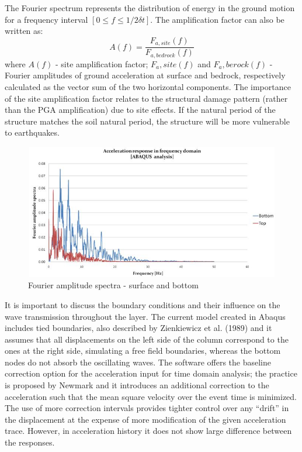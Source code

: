 	The Fourier spectrum represents the distribution of energy in the ground motion for a frequency interval $[0 ≤ f ≤ 1/2\delta t]$. The amplification factor can also be written as:
	\begin{equation}
	A(f)=\frac{F_{a,site}(f)}{F_{a,bedrock}(f)}
	\end{equation}
	where $A(f)$ - site amplification factor; $F_a,site(f)$ and $F_a,berock(f)$ - Fourier amplitudes of ground acceleration at surface and bedrock, respectively calculated as the vector sum of the two horizontal components. The importance of the site amplification factor relates to the structural damage pattern (rather than the PGA amplification) due to site effects. If the natural period of the structure matches the soil natural period, the structure will be more vulnerable to earthquakes. 
	\begin{figure}[h!]
		\centering
		\includegraphics[width=0.7\linewidth]{"Fourier"}
		\caption{Fourier amplitude spectra - surface and bottom}
		\label{fourier}
	\end{figure}
	It is important to discuss the boundary conditions and their influence on the wave transmission throughout the layer. The current model created in Abaqus includes tied boundaries, also described by Zienkiewicz et al. (1989) \cite{zienkiewicz1989earthquake} and it assumes that all displacements on the left side of the column correspond to the ones at the right side, simulating a free field boundaries, whereas the bottom nodes do not absorb the oscillating waves. The software offers the baseline correction option for the acceleration input for time domain analysis; the practice is proposed by Newmark \cite{newmark1959method} and it introduces an additional correction to the acceleration such that the mean square velocity over the event time is minimized. The use of more correction intervals provides tighter control over any “drift” in the displacement at the expense of more modification of the given acceleration trace. However, in acceleration history it does not show large difference between the responses.
	
